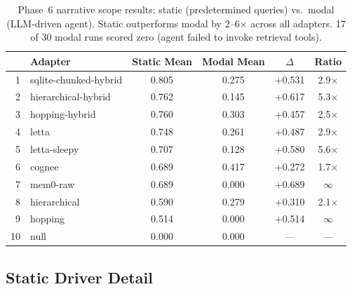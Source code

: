 \documentclass[11pt,letterpaper]{article}
\begin{document}
\begin{table}[H]
\centering
\small
\begin{tabular}{rlcccc}
\toprule
& \textbf{Adapter} & \textbf{Static Mean} & \textbf{Modal Mean} & \textbf{$\Delta$} & \textbf{Ratio} \\
\midrule
\rowcolor{toprow}
1 & sqlite-chunked-hybrid & 0.805 & 0.275 & +0.531 & 2.9$\times$ \\
\rowcolor{toprow}
2 & hierarchical-hybrid & 0.762 & 0.145 & +0.617 & 5.3$\times$ \\
3 & hopping-hybrid & 0.760 & 0.303 & +0.457 & 2.5$\times$ \\
4 & letta & 0.748 & 0.261 & +0.487 & 2.9$\times$ \\
5 & letta-sleepy & 0.707 & 0.128 & +0.580 & 5.6$\times$ \\
6 & cognee & 0.689 & 0.417 & +0.272 & 1.7$\times$ \\
7 & mem0-raw & 0.689 & 0.000 & +0.689 & $\infty$ \\
8 & hierarchical & 0.590 & 0.279 & +0.310 & 2.1$\times$ \\
9 & hopping & 0.514 & 0.000 & +0.514 & $\infty$ \\
\rowcolor{zerorow}
10 & null & 0.000 & 0.000 & --- & --- \\
\bottomrule
\end{tabular}
\caption{Phase~6 narrative scope results: static (predetermined queries) vs.\ modal (LLM-driven agent). Static outperforms modal by 2--6$\times$ across all adapters. 17 of 30 modal runs scored zero (agent failed to invoke retrieval tools).}
\label{tab:phase6-comparison}
\end{table}

\subsection{Static Driver Detail}
\end{document}
